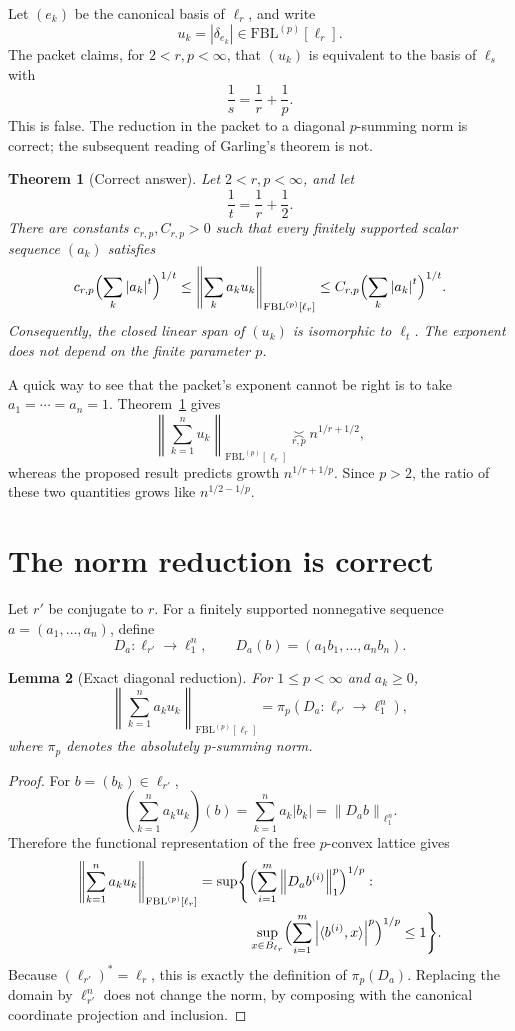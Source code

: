 \documentclass[11pt]{article}
\newtheorem{theorem}{Theorem}
\newtheorem{lemma}[theorem]{Lemma}
\theoremstyle{remark}
\newcommand{\FBL}{\mathrm{FBL}}
\newcommand{\norm}[1]{\left\lVert #1\right\rVert}
\newcommand{\abs}[1]{\left\lvert #1\right\rvert}
\newcommand{\asympC}[1]{\mathrel{\underset{#1}{\asymp}}}
\begin{document}
Let $(e_k)$ be the canonical basis of $\ell_r$, and write
\[
  u_k=\abs{\delta_{e_k}}\in \FBL^{(p)}[\ell_r].
\]
The packet claims, for $2<r,p<\infty$, that $(u_k)$ is equivalent to the
basis of $\ell_s$ with
\[
  \frac1s=\frac1r+\frac1p.
\]
This is false.  The reduction in the packet to a diagonal $p$-summing norm
is correct; the subsequent reading of Garling's theorem is not.

\begin{theorem}[Correct answer]
\label{thm:main}
Let $2<r,p<\infty$, and let
\[
  \frac1t=\frac1r+\frac12.
\]
There are constants $c_{r,p},C_{r,p}>0$ such that every finitely supported
scalar sequence $(a_k)$ satisfies
\[
 c_{r,p}\Bigl(\sum_k \abs{a_k}^{t}\Bigr)^{1/t}
 \le
 \norm{\sum_k a_k u_k}_{\FBL^{(p)}[\ell_r]}
 \le
 C_{r,p}\Bigl(\sum_k \abs{a_k}^{t}\Bigr)^{1/t}.
\]
Consequently, the closed linear span of $(u_k)$ is isomorphic to $\ell_t$.
The exponent does not depend on the finite parameter $p$.
\end{theorem}

A quick way to see that the packet's exponent cannot be right is to take
$a_1=\cdots=a_n=1$.  Theorem~\ref{thm:main} gives
\[
 \norm{\sum_{k=1}^n u_k}_{\FBL^{(p)}[\ell_r]}
 \asympC{r,p} n^{1/r+1/2},
\]
whereas the proposed result predicts growth $n^{1/r+1/p}$.  Since $p>2$,
the ratio of these two quantities grows like $n^{1/2-1/p}$.

\section{The norm reduction is correct}

Let $r'$ be conjugate to $r$.  For a finitely supported nonnegative
sequence $a=(a_1,\ldots,a_n)$, define
\[
 D_a:\ell_{r'}\longrightarrow \ell_1^n,
 \qquad
 D_a(b)= (a_1b_1,\ldots,a_nb_n).
\]

\begin{lemma}[Exact diagonal reduction]
\label{lem:reduction}
For $1\le p<\infty$ and $a_k\ge0$,
\[
 \norm{\sum_{k=1}^n a_k u_k}_{\FBL^{(p)}[\ell_r]}
 =\pi_p(D_a:\ell_{r'}\to\ell_1^n),
\]
where $\pi_p$ denotes the absolutely $p$-summing norm.
\end{lemma}

\begin{proof}
For $b=(b_k)\in\ell_{r'}$,
\[
 \left(\sum_{k=1}^n a_k u_k\right)(b)
 =\sum_{k=1}^n a_k\abs{b_k}
 =\norm{D_ab}_{\ell_1^n}.
\]
Therefore the functional representation of the free $p$-convex lattice
gives
\begin{align*}
 \norm{\sum_{k=1}^n a_k u_k}_{\FBL^{(p)}[\ell_r]}
 =\sup\Biggl\{&
   \Bigl(\sum_{i=1}^m \norm{D_ab^{(i)}}_1^p\Bigr)^{1/p}:\\
 &\sup_{x\in B_{\ell_r}}
   \Bigl(\sum_{i=1}^m \abs{\langle b^{(i)},x\rangle}^p\Bigr)^{1/p}
   \le1\Biggr\}.
\end{align*}
Because $(\ell_{r'})^*=\ell_r$, this is exactly the definition of
$\pi_p(D_a)$.  Replacing the domain by $\ell_{r'}^n$ does not change the
norm, by composing with the canonical coordinate projection and inclusion.
\end{proof}
\end{document}

